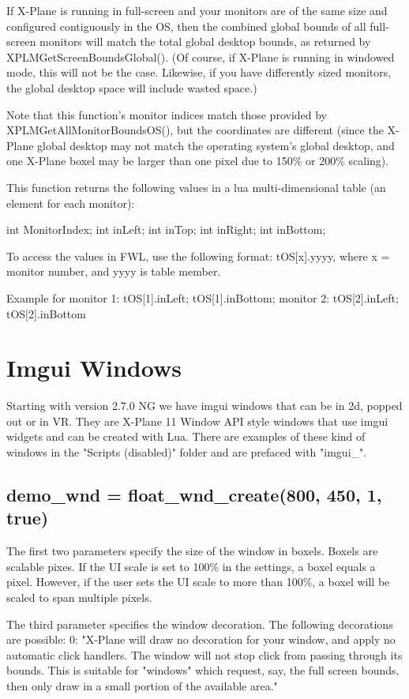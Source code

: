 \documentclass[11pt,parskip=half,a4paper]{scrartcl}
\begin{document}
If X-Plane is running in full-screen and your monitors are of the same size and configured contiguously in the OS, then the combined global bounds of all full-screen monitors will match the total global desktop bounds, as returned by XPLMGetScreenBoundsGlobal(). (Of course, if X-Plane is running in windowed mode, this will not be the case. Likewise, if you have differently sized monitors, the global desktop space will include wasted space.)

Note that this function's monitor indices match those provided by XPLMGetAllMonitorBoundsOS(), but the coordinates are different (since the X-Plane global desktop may not match the operating system's global desktop, and one X-Plane boxel may be larger than one pixel due to 150\% or 200\% scaling).

This function returns the following values in a lua multi-dimensional table (an element for each monitor):

    int        MonitorIndex;
    int        inLeft;
    int        inTop;
    int        inRight;
    int        inBottom;
 

To access the values in FWL, use the following format: tOS[x].yyyy, where x = monitor number, and yyyy is table member.

Example for monitor 1: tOS[1].inLeft; tOS[1].inBottom; monitor 2: tOS[2].inLeft; tOS[2].inBottom  

\newpage
\section{Imgui Windows}

Starting with version 2.7.0 NG we have imgui windows that can be in 2d, popped out or in VR. They are X-Plane 11 Window API style windows that use imgui widgets and can be created with Lua. There are examples of these kind of windows in the "Scripts (disabled)" folder and are prefaced with "imgui\_".

\subsection{demo\_wnd = float\_wnd\_create(800, 450, 1, true)}

The first two parameters specify the size of the window in boxels. Boxels are
scalable pixes. If the UI scale is set to 100\% in the settings, a boxel equals
a pixel. However, if the user sets the UI scale to more than 100\%, a boxel will
be scaled to span multiple pixels.

The third parameter specifies the window decoration. The following decorations are possible:
\hspace*{10mm}	0: "X-Plane will draw no decoration for your window, and apply no automatic click
\hspace*{10mm}	handlers. The window will not stop click from passing through its bounds. This is
\hspace*{10mm}	suitable for "windows" which request, say, the full screen bounds, then only draw in a
\hspace*{10mm}	small portion of the available area."
\end{document}
